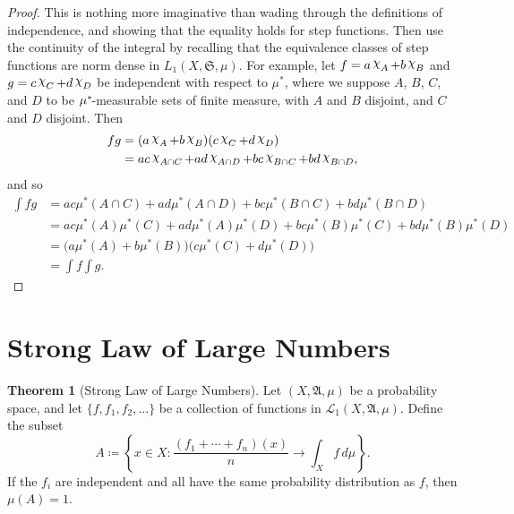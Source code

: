 \documentclass[
twoside=true,
paper=letter,
fontsize=9pt,
pagesize=auto,
leqno,
openany,
headsepline,
overfullrule,
]{scrbook}
\theoremstyle{plain}
\theoremstyle{plain}
\theoremstyle{definition}
\theoremstyle{bfnoteitalic}
\newtheorem{thmboldnote}[thm]{Theorem}
\theoremstyle{bfnoteroman}
\newcommand{\sigalg}[1]{\mathfrak{#1}}
\newcommand{\cali}[1]{\mathscr{#1}}
\newcommand{\definedby}{\coloneqq}
\newcommand{\charfunction}[1]{\mathop{{\raisebox{2pt}{$\chi$}}_{#1}}}
\newcommand{\meets}{\cap}
\newcommand{\semiring}{\sigalg{S}}
\newcommand{\sigmaalgebra}{\sigalg{A}}
\newcommand{\kernast}{\ast\kern-1pt}
\newcommand{\function}{f}
\newcommand{\functionii}{g}
\newcommand{\measurespace}{X}
\newcommand{\mspaceelt}{x}
\newcommand{\measure}{\mu}
\newcommand{\seti}{A}
\newcommand{\setii}{B}
\newcommand{\setiii}{C}
\newcommand{\setiv}{D}
\begin{document}
\begin{proof}
This is nothing more imaginative than wading through the definitions of independence,
and showing that the equality holds for step functions. Then use the continuity of the integral by recalling that the equivalence classes of step functions are norm dense in 
$L_1(\measurespace, \semiring,\measure)$.
For example, let 
$\function = a\charfunction{\seti} + b\charfunction{\setii}$ and 
$\functionii = c\charfunction{\setiii} + d\charfunction{\setiv}$ be independent with respect to $\measure^*$,
where we suppose $\seti$, $\setii$, $\setiii$, and $\setiv$ to be $\measure^\kernast$-measurable sets of finite measure, with $\seti$ and $\setii$ disjoint, and $\setiii$ and $\setiv$ disjoint. Then
\begin{align*}
\function\functionii 
& =
(a\charfunction{\seti} + b\charfunction{\setii})
(c\charfunction{\setiii} + d\charfunction{\setiv}) \\
& = ac\charfunction{\seti\meets\setiii}
+ ad\charfunction{\seti\meets\setiv}
+ bc\charfunction{\setii\meets\setiii}
+ bd\charfunction{\setii\meets\setiv},
\end{align*}
and so 
\begin{align*}
\int fg 
& = ac\measure^*(\seti\meets\setiii)
+ ad\measure^*(\seti\meets\setiv)
+ bc\measure^*(\setii\meets\setiii)
+ bd\measure^*(\setii\meets\setiv)\\
& = ac\measure^*(\seti)\measure^*(\setiii)
+ ad\measure^*(\seti)\measure^*(\setiv)
+ bc\measure^*(\setii)\measure^*(\setiii)
+ bd\measure^*(\setii)\measure^*(\setiv)\\
& = \bigl(a\measure^*(\seti) + b\measure^*(\setii)\bigr)
\bigl(c\measure^*(\setiii) + d\measure^*(\setiv)\bigr) \\
& = \int \function \int \functionii.
\end{align*}
\end{proof}




\section{Strong Law of Large Numbers}
\begin{thmboldnote}[Strong Law of Large Numbers]\label{large_numbers}
Let $(\measurespace,\sigmaalgebra,\measure)$ be a probability space, and let
$\{\function, \function_1,\function_2,\ldots\}$ be a collection of functions in  $\cali{L}_1(\measurespace,\sigmaalgebra,\measure)$. Define the subset
\[
\seti \definedby
\left\{ \mspaceelt\in\measurespace : 
\frac{(\function_1 + \cdots + \function_n)(\mspaceelt)}{n}
\to 
\int_\measurespace \function \, d\measure
\right\}.
\]
If the $\function_i$ are independent and all have the same probability distribution as $\function$, then 
$\measure(\seti) = 1$.
\end{thmboldnote}
\end{document}
